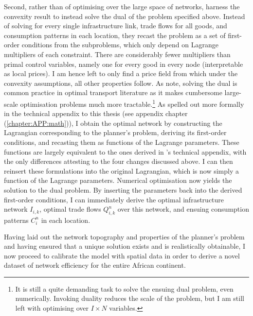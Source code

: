 \documentclass[11pt, oneside]{article}   	%
\let\oldref\ref
\renewcommand{\ref}[1]{(\oldref{#1})}
\begin{document}
Second, rather than of optimising over the large space of networks, \citeauthor{fajgelbaum_optimal_2017} harness the convexity result to instead solve the dual of the problem specified above. Instead of solving for every single infrastructure link, trade flows for all goods, and consumption patterns in each location, they recast the problem as a set of first-order conditions from the subproblems, which only depend on Lagrange multipliers of each constraint. There are considerably fewer multipliers than primal control variables, namely one for every good in every node (interpretable as local prices). I am hence left to only find a price field from which under the convexity assumptions, all other properties follow. As \citeauthor{fajgelbaum_optimal_2017} note, solving the dual is common practice in optimal transport literature as it makes cumbersome large-scale optimisation problems much more tractable.\footnote{It is still a quite demanding  task to solve the ensuing dual problem, even numerically. Invoking duality reduces the scale of the problem, but I am still left with optimising over $I \times N$ variables.} As spelled out more formally in the technical appendix to this thesis (see appendix chapter \ref{chapter:APP:math}), I obtain the optimal network by constructing the Lagrangian corresponding to the planner's problem, deriving its first-order conditions, and recasting them as functions of the Lagrange parameters. These functions are largely equivalent to the ones derived in \citeauthor{fajgelbaum_optimal_2017}'s technical appendix, with the only differences attesting to the four changes discussed above. I can then reinsert these formulations into the original Lagrangian, which is now simply a function of the Lagrange parameters. Numerical optimisation now yields the solution to the dual problem. By inserting the parameters back into the derived first-order conditions, I can immediately derive the optimal infrastructure network $I_{i,k}$, optimal trade flows $Q_{i,k}^{n}$ over this network, and ensuing consumption patterns $C_{i}^{n}$ in each location.

Having laid out the network topography and properties of the planner's problem and having ensured that a unique solution exists and is realistically obtainable, I now proceed to calibrate the model with spatial data in order to derive a novel dataset of network efficiency for the entire African continent.
\end{document}
